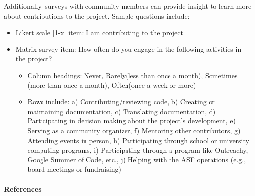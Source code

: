 Additionally, surveys with community members can provide insight to
learn more about contributions to the project. Sample questions include:

\begin{itemize}
\tightlist
\item
  Likert scale {[}1-x{]} item: I am contributing to the project
\item
  Matrix survey item: How often do you engage in the following
  activities in the project?

  \begin{itemize}
  \tightlist
  \item
    Column headings: Never, Rarely(less than once a month), Sometimes
    (more than once a month), Often(once a week or more)
  \item
    Rows include: a) Contributing/reviewing code, b) Creating or
    maintaining documentation, c) Translating documentation, d)
    Participating in decision making about the project's development, e)
    Serving as a community organizer, f) Mentoring other contributors,
    g) Attending events in person, h) Participating through school or
    university computing programs, i) Participating through a program
    like Outreachy, Google Summer of Code, etc., j) Helping with the ASF
    operations (e.g., board meetings or fundraising)
  \end{itemize}
\end{itemize}

\hypertarget{references}{%
\paragraph{References}\label{references}}
